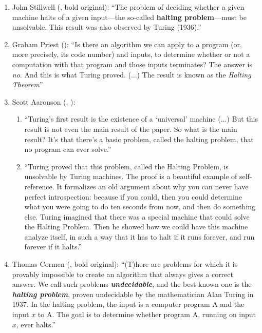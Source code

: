 \documentclass{amsart}
\begin{document}
\begin{enumerate}\small

    \item John Stillwell (\cite[p. 370]{stillwell2022story}, bold original): \enquote{The problem of deciding whether a given machine halts of a given input---the so-called \textbf{halting problem}---must be unsolvable. This result was also observed by Turing (1936).}

    \bigskip

     \item Graham Priest (\cite[pp. 105-107]{priest2017logic}): \enquote{Is there an algorithm we can apply to a program (or, more precisely, its code number) and inputs, to determine whether or not a computation with that program and those inputs terminates? The answer is \textit{no}. And this is what Turing proved. (...) The result is known as the \textit{Halting Theorem}}\goodbreak

    \bigskip

      \item Scott Aaronson (\cite[p. 21]{aaronson2013quantum}, \cite{aaronson1999can}): 

      \bigskip 
      
      \begin{enumerate}

          \item \enquote{Turing's first result is the existence of a \enquote{universal} machine (...) But this result is not even the main result of the paper. So what is the main result? It's that there's a basic problem, called the halting problem, that no program can ever solve.}

          \bigskip 
          \item \enquote{Turing proved that this problem, called the Halting Problem, is unsolvable by Turing machines. The proof is a beautiful example of self-reference. It formalizes an old argument about why you can never have perfect introspection: because if you could, then you could determine what you were going to do ten seconds from now, and then do something else. Turing imagined that there was a special machine that could solve the Halting Problem. Then he showed how we could have this machine analyze itself, in such a way that it has to halt if it runs forever, and run forever if it halts.} 
      \end{enumerate}

    \bigskip 

    \item Thomas Cormen (\cite[p. 210]{cormen2013algorithms}, bold original): \enquote{(T)here are problems for which it is provably impossible to create an algorithm that always gives a correct answer. We call such problems \textit{\textbf{undecidable}}, and the best-known one is the \textit{\textbf{halting problem}}, proven undecidable by the mathematician Alan Turing in 1937. In the halting problem, the input is a computer program A and the input $x$ to A. The goal is to determine whether program A, running on input $x$, ever halts.}


\end{enumerate}
\end{document}
